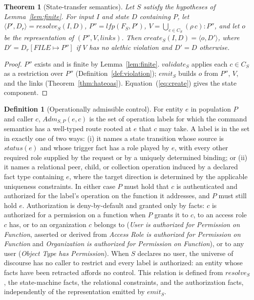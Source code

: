 \documentclass[10pt,twocolumn]{article}
\theoremstyle{plain}
\newtheorem{theorem}{Theorem}
\theoremstyle{definition}
\newtheorem{definition}{Definition}
\begin{document}
\begin{theorem}[State-transfer semantics]\label{thm:complete}
Let $S$ satisfy the hypotheses of Lemma~\ref{lem:finite}. For input $I$ and state $D$ containing $P$, let $\langle P',D_r\rangle=\mathit{resolve}_S(I,D)$, $P''=\mathit{lfp}(F_S,P')$, $V=\bigcup_{c\in C_S}(\rho\,c)\!:\!P''$, and let $o$ be the representation of $(P'',V,\mathit{links})$. Then $\mathit{create}_S(I,D)=\langle o,D'\rangle$, where $D'=D_r[\mathit{FILE}\mapsto P'']$ if $V$ has no alethic violation and $D'=D$ otherwise.
\end{theorem}
\begin{proof}
$P''$ exists and is finite by Lemma~\ref{lem:finite}. $\mathit{validate}_S$ applies each $c\in C_S$ as a restriction over $P''$ (Definition~\ref{def:violation}); $\mathit{emit}_S$ builds $o$ from $P''$, $V$, and the links (Theorem~\ref{thm:hateoas}). Equation~(\ref{eq:create}) gives the state component.
\end{proof}

\begin{definition}[Operationally admissible control]\label{def:admissible}
For entity $e$ in population $P$ and caller $c$, $\mathit{Adm}_{S,P}(e,c)$ is the set of operation labels for which the command semantics has a well-typed route rooted at $e$ that $c$ may take. A label is in the set in exactly one of two ways: (i) it names a state transition whose source is $\mathit{status}(e)$ and whose trigger fact has a role played by $e$, with every other required role supplied by the request or by a uniquely determined binding; or (ii) it names a relational peer, child, or collection operation induced by a declared fact type containing $e$, where the target direction is determined by the applicable uniqueness constraints. In either case $P$ must hold that $c$ is authenticated and authorized for the label's operation on the function it addresses, and $P$ must still hold $e$. Authorization is deny-by-default and granted only by facts: $c$ is authorized for a permission on a function when $P$ grants it to $c$, to an access role $c$ has, or to an organization $c$ belongs to (\emph{User is authorized for Permission on Function}, asserted or derived from \emph{Access Role is authorized for Permission on Function} and \emph{Organization is authorized for Permission on Function}), or to any user (\emph{Object Type has Permission}). When $S$ declares no user, the universe of discourse has no caller to restrict and every label is authorized: an entity whose facts have been retracted affords no control. This relation is defined from $\mathit{resolve}_S$, the state-machine facts, the relational constraints, and the authorization facts, independently of the representation emitted by $\mathit{emit}_S$.
\end{definition}
\end{document}

